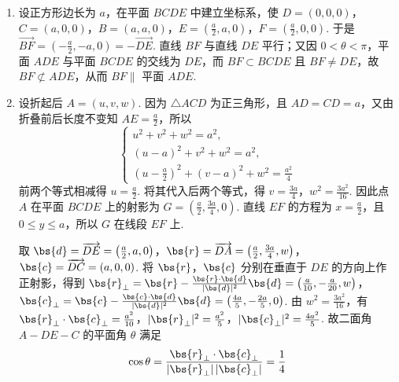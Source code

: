 \begin{solution}
\begin{enumerate}
\item 设正方形边长为 \(a\)，在平面 \(BCDE\) 中建立坐标系，使 \(D=(0,0,0)\)，\(C=(a,0,0)\)，\(B=(a,a,0)\)，\(E=\left(\frac{a}{2},a,0\right)\)，\(F=\left(\frac{a}{2},0,0\right)\). 于是 \(\overrightarrow{BF}=\left(-\frac{a}{2},-a,0\right)=-\overrightarrow{DE}\). 直线 \(BF\) 与直线 \(DE\) 平行；又因 \(0<\theta<\pi\)，平面 \(ADE\) 与平面 \(BCDE\) 的交线为 \(DE\)，而 \(BF\subset BCDE\) 且 \(BF\ne DE\)，故 \(BF\not\subset ADE\)，从而 \(BF\parallel\) 平面 \(ADE\).

\item 设折起后 \(A=(u,v,w)\). 因为 \(\triangle ACD\) 为正三角形，且 \(AD=CD=a\)，又由折叠前后长度不变知 \(AE=\frac{a}{2}\)，所以
\[
\begin{cases}
u^2+v^2+w^2=a^2,\\
(u-a)^2+v^2+w^2=a^2,\\
\left(u-\frac{a}{2}\right)^2+(v-a)^2+w^2=\frac{a^2}{4}
\end{cases}
\]
前两个等式相减得 \(u=\frac{a}{2}\). 将其代入后两个等式，得 \(v=\frac{3a}{4}\)，\(w^2=\frac{3a^2}{16}\).
因此点 \(A\) 在平面 \(BCDE\) 上的射影为 \(G=\left(\frac{a}{2},\frac{3a}{4},0\right)\). 直线 \(EF\) 的方程为 \(x=\frac{a}{2}\)，且 \(0\leqslant y\leqslant a\)，所以 \(G\) 在线段 \(EF\) 上.

取 \(\bs{d}=\overrightarrow{DE}=\left(\frac{a}{2},a,0\right)\)，\(\bs{r}=\overrightarrow{DA}=\left(\frac{a}{2},\frac{3a}{4},w\right)\)，\(\bs{c}=\overrightarrow{DC}=(a,0,0)\).
将 \(\bs{r}\)，\(\bs{c}\) 分别在垂直于 \(DE\) 的方向上作正射影，得到
\(\bs{r}_{\perp}=\bs{r}-\frac{\bs{r}\cdot\bs{d}}{|\bs{d}|^2}\bs{d}=\left(\frac{a}{10},-\frac{a}{20},w\right)\)，\(\bs{c}_{\perp}=\bs{c}-\frac{\bs{c}\cdot\bs{d}}{|\bs{d}|^2}\bs{d}=\left(\frac{4a}{5},-\frac{2a}{5},0\right)\).
由 \(w^2=\frac{3a^2}{16}\)，有
\(\bs{r}_{\perp}\cdot\bs{c}_{\perp}=\frac{a^2}{10}\)，\(|\bs{r}_{\perp}|^2=\frac{a^2}{5}\)，\(|\bs{c}_{\perp}|^2=\frac{4a^2}{5}\).
故二面角 \(A-DE-C\) 的平面角 \(\theta\) 满足
\[
\cos\theta=\frac{\bs{r}_{\perp}\cdot\bs{c}_{\perp}}{|\bs{r}_{\perp}|\,|\bs{c}_{\perp}|}=\frac{1}{4}
\]
\end{enumerate}
\end{solution}

